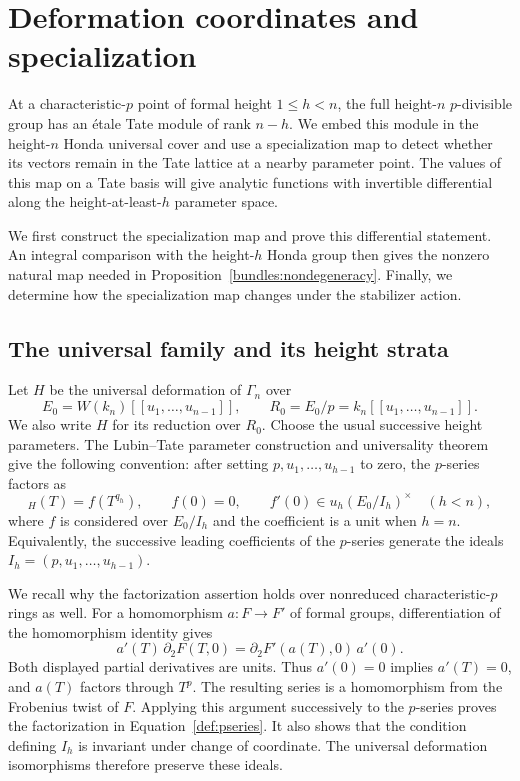 \section{Deformation coordinates and specialization}
\label{sec:deformations}

At a characteristic-$p$ point of formal height $1\leq h<n$, the full
height-$n$ $p$-divisible group has an \'etale Tate module of rank $n-h$.
We embed this module in the height-$n$ Honda universal cover and use a
specialization map to detect whether its vectors remain in the Tate
lattice at a nearby parameter point.  The values of this map on a Tate
basis will give analytic functions with invertible differential along
the height-at-least-$h$ parameter space.

We first construct the specialization map and prove this differential
statement.  An integral comparison with the height-$h$ Honda group then
gives the nonzero natural map needed in
Proposition~\ref{bundles:nondegeneracy}.  Finally, we determine how the
specialization map changes under the stabilizer action.

\subsection{The universal family and its height strata}

Let $H$ be the universal deformation of $\Gamma_n$ over
\[
 E_0=W(k_n)[[u_1,\ldots,u_{n-1}]],
 \qquad
 R_0=E_0/p=k_n[[u_1,\ldots,u_{n-1}]].
\]
We also write $H$ for its reduction over $R_0$.
Choose the usual successive height parameters.  The Lubin--Tate parameter
construction and universality theorem
\cite[Proposition~1.1 and Theorem~3.1]{LT66} give the following convention:
after setting $p,u_1,\ldots,u_{h-1}$ to zero, the $p$-series factors as
\begin{equation}
 [p]_H(T)=f(T^{q_h}),\qquad
 f(0)=0,\qquad
 f'(0)\in u_h(E_0/I_h)^\times
 \quad (h<n),
 \label{def:pseries}
\end{equation}
where $f$ is considered over $E_0/I_h$ and the coefficient is a unit when
$h=n$.  Equivalently, the successive leading coefficients of the
$p$-series generate the ideals
$I_h=(p,u_1,\ldots,u_{h-1})$.

We recall why the factorization assertion holds over nonreduced
characteristic-$p$ rings as well.  For a homomorphism $a:F\to F'$ of formal
groups, differentiation of the homomorphism identity gives
\[
 a'(T)\,\partial_2F(T,0)
   =\partial_2F'(a(T),0)\,a'(0).
\]
Both displayed partial derivatives are units.  Thus $a'(0)=0$ implies
$a'(T)=0$, and $a(T)$ factors through $T^p$.  The resulting series is a
homomorphism from the Frobenius twist of $F$.  Applying this argument
successively to the $p$-series proves the factorization in
Equation~\eqref{def:pseries}.  It also shows that the condition defining $I_h$
is invariant under change of coordinate.  The universal deformation
isomorphisms therefore preserve these ideals.


